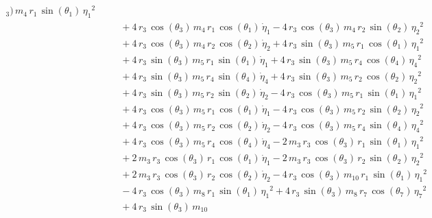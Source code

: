 \begin{eqnarray*}
{_{3}})\,m_{4}\,r_{1}\,\sin({\theta_{1}})\,{{\eta_{1}}}^2
 \\ &&\quad\mbox{} + 4\,r_{3}\,\cos({\theta_{3}})\,m_{4}\,r_{1}\,\cos(
{\theta_{1}})\,{\dot{\eta}_{1}} - 4\,r_{3}\,\cos({\theta_{3}})\,m_{4}
\,r_{2}\,\sin({\theta_{2}})\,{{\eta_{2}}}^2 \\ &&\quad\mbox{} + 4\,r_{
3}\,\cos({\theta_{3}})\,m_{4}\,r_{2}\,\cos({\theta_{2}})\,{\dot{\eta}
_{2}} + 4\,r_{3}\,\sin({\theta_{3}})\,m_{5}\,r_{1}\,\cos({\theta_{1}})
\,{{\eta_{1}}}^2 \\ &&\quad\mbox{} + 4\,r_{3}\,\sin({\theta_{3}})\,m_{
5}\,r_{1}\,\sin({\theta_{1}})\,{\dot{\eta}_{1}} + 4\,r_{3}\,\sin({
\theta_{3}})\,m_{5}\,r_{4}\,\cos({\theta_{4}})\,{{\eta_{4}}}^2
 \\ &&\quad\mbox{} + 4\,r_{3}\,\sin({\theta_{3}})\,m_{5}\,r_{4}\,\sin(
{\theta_{4}})\,{\dot{\eta}_{4}} + 4\,r_{3}\,\sin({\theta_{3}})\,m_{5}
\,r_{2}\,\cos({\theta_{2}})\,{{\eta_{2}}}^2 \\ &&\quad\mbox{} + 4\,r_{
3}\,\sin({\theta_{3}})\,m_{5}\,r_{2}\,\sin({\theta_{2}})\,{\dot{\eta}
_{2}} - 4\,r_{3}\,\cos({\theta_{3}})\,m_{5}\,r_{1}\,\sin({\theta_{1}})
\,{{\eta_{1}}}^2 \\ &&\quad\mbox{} + 4\,r_{3}\,\cos({\theta_{3}})\,m_{
5}\,r_{1}\,\cos({\theta_{1}})\,{\dot{\eta}_{1}} - 4\,r_{3}\,\cos({
\theta_{3}})\,m_{5}\,r_{2}\,\sin({\theta_{2}})\,{{\eta_{2}}}^2
 \\ &&\quad\mbox{} + 4\,r_{3}\,\cos({\theta_{3}})\,m_{5}\,r_{2}\,\cos(
{\theta_{2}})\,{\dot{\eta}_{2}} - 4\,r_{3}\,\cos({\theta_{3}})\,m_{5}
\,r_{4}\,\sin({\theta_{4}})\,{{\eta_{4}}}^2 \\ &&\quad\mbox{} + 4\,r_{
3}\,\cos({\theta_{3}})\,m_{5}\,r_{4}\,\cos({\theta_{4}})\,{\dot{\eta}
_{4}} - 2\,m_{3}\,r_{3}\,\cos({\theta_{3}})\,r_{1}\,\sin({\theta_{1}})
\,{{\eta_{1}}}^2 \\ &&\quad\mbox{} + 2\,m_{3}\,r_{3}\,\cos({\theta_{3}
})\,r_{1}\,\cos({\theta_{1}})\,{\dot{\eta}_{1}} - 2\,m_{3}\,r_{3}\,
\cos({\theta_{3}})\,r_{2}\,\sin({\theta_{2}})\,{{\eta_{2}}}^2
 \\ &&\quad\mbox{} + 2\,m_{3}\,r_{3}\,\cos({\theta_{3}})\,r_{2}\,\cos(
{\theta_{2}})\,{\dot{\eta}_{2}} - 4\,r_{3}\,\cos({\theta_{3}})\,m_{10}
\,r_{1}\,\sin({\theta_{1}})\,{{\eta_{1}}}^2 \\ &&\quad\mbox{} - 4\,r_{
3}\,\cos({\theta_{3}})\,m_{8}\,r_{1}\,\sin({\theta_{1}})\,{{\eta_{1}}}
^2 + 4\,r_{3}\,\sin({\theta_{3}})\,m_{8}\,r_{7}\,\cos({\theta_{7}})\,{
{\eta_{7}}}^2 \\ &&\quad\mbox{} + 4\,r_{3}\,\sin({\theta_{3}})\,m_{10}

\end{eqnarray*}
